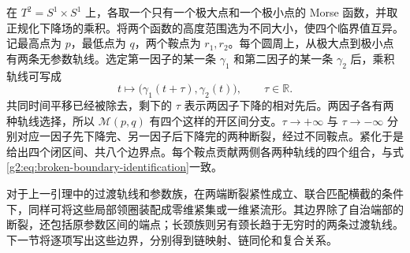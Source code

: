\begin{example}\label{g2:exm:torus-four-intervals}
	在 \(T^2=S^1\times S^1\) 上，各取一个只有一个极大点和一个极小点的 Morse 函数，并取正规化下降场的乘积。将两个函数的高度范围选为不同大小，使四个临界值互异。记最高点为 \(p\)，最低点为 \(q\)，两个鞍点为 \(r_1,r_2\)。每个圆周上，从极大点到极小点有两条无参数轨线。选定第一因子的某一条 \(\gamma_1\) 和第二因子的某一条 \(\gamma_2\) 后，乘积轨线可写成
	\[
		t\longmapsto\bigl(\gamma_1(t+\tau),\gamma_2(t)\bigr),\qquad \tau\in\mathbb R.
	\]
	共同时间平移已经被除去，剩下的 \(\tau\) 表示两因子下降的相对先后。两因子各有两种轨线选择，所以 \(\mathcal M(p,q)\) 有四个这样的开区间分支。\(\tau\to+\infty\) 与 \(\tau\to-\infty\) 分别对应一因子先下降完、另一因子后下降完的两种断裂，经过不同鞍点。紧化于是给出四个闭区间、共八个边界点。每个鞍点贡献两侧各两种轨线的四个组合，与式\eqref{g2:eq:broken-boundary-identification}一致。
\end{example}

对于上一引理中的过渡轨线和参数族，在两端断裂紧性成立、联合匹配横截的条件下，同样可将这些局部领圈装配成零维紧集或一维紧流形。其边界除了自治端部的断裂，还包括原参数区间的端点；长颈族则另有颈长趋于无穷时的两条过渡轨线。下一节将逐项写出这些边界，分别得到链映射、链同伦和复合关系。
